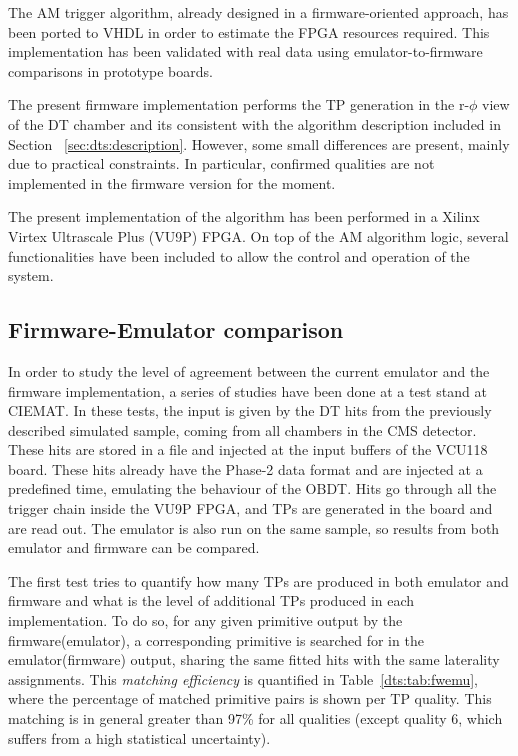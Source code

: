 \documentclass[../main.tex]{subfiles}
\begin{document}
The AM trigger algorithm, already designed in a firmware-oriented approach, has been ported to VHDL in order to estimate the FPGA resources required. This implementation has been validated with real data using emulator-to-firmware comparisons in prototype boards.

The present firmware implementation performs the TP generation in the r-$\phi$ view of the DT chamber and its consistent with the algorithm description included in Section~ \ref{sec:dts:description}. However, some small differences are present, mainly due to practical constraints. In particular, confirmed qualities are not implemented in the firmware version for the moment. 

The present implementation of the algorithm has been performed in a Xilinx Virtex Ultrascale Plus (VU9P) FPGA. On top of the AM algorithm logic, several functionalities have been included to allow the control and operation of the system.

\subsection{Firmware-Emulator comparison}

In order to study the level of agreement between the current emulator and the firmware implementation, a series of studies have been done at a test stand at CIEMAT. In these tests, the input is given by the DT hits from the previously described simulated sample, coming from all chambers in the CMS detector. These hits are stored in a file and injected at the input buffers of the VCU118 board. These hits already have the Phase-2 data format and are injected at a predefined time, emulating the behaviour of the OBDT. Hits go through all the trigger chain inside the VU9P FPGA, and TPs are generated in the board and are read out. The emulator is also run on the same sample, so results from both emulator and firmware can be compared.

The first test tries to quantify how many TPs are produced in both emulator and firmware and what is the level of additional TPs produced in each implementation. To do so, for any given primitive output by the firmware(emulator), a corresponding primitive is searched for in the emulator(firmware) output, sharing the same fitted hits with the same laterality assignments. This \textit{matching efficiency} is quantified in Table~\ref{dts:tab:fwemu}, where the percentage of matched primitive pairs is shown per TP quality. This matching is in general greater than 97\% for all qualities (except quality 6, which suffers from a high statistical uncertainty).
\end{document}

